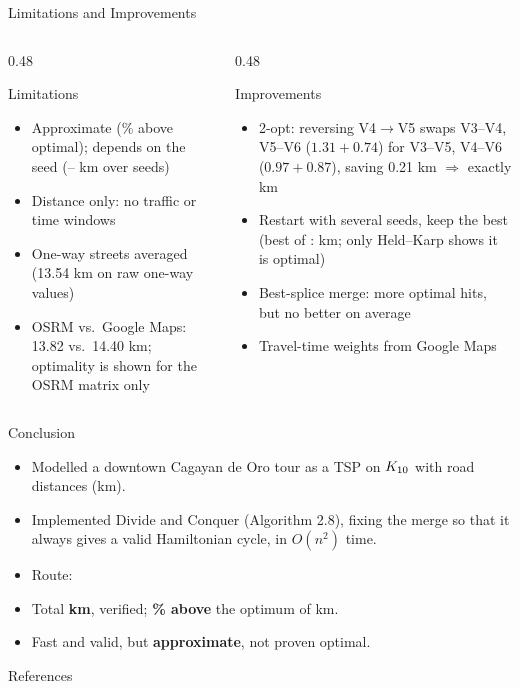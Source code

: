 \begin{frame}{Limitations and Improvements}
  \begin{columns}[T]
    \begin{column}{0.48\textwidth}
      \begin{block}{Limitations}
        \small
        \begin{itemize}
          \item Approximate (\DCGap\% above optimal); depends on the seed (\BridgeBest{}--\BridgeWorst{} km
                over \RunCount{} seeds)
          \item Distance only: no traffic or time windows
          \item One-way streets averaged (13.54 km on raw one-way values)
          \item OSRM vs.\ Google Maps: 13.82 vs.\ 14.40 km; optimality is shown for the OSRM matrix only
        \end{itemize}
      \end{block}
    \end{column}
    \begin{column}{0.48\textwidth}
      \begin{block}{Improvements}
        \small
        \begin{itemize}
          \item 2-opt: reversing V4$\to$V5 swaps V3--V4, V5--V6 ($1.31+0.74$) for V3--V5, V4--V6
                ($0.97+0.87$), saving 0.21 km $\Rightarrow$ exactly \OptTotal{} km
          \item Restart with several seeds, keep the best (best of \RunCount{}: \BridgeBest{} km; only
                Held--Karp shows it is optimal)
          \item Best-splice merge: more optimal hits, but no better on average
          \item Travel-time weights from Google Maps
        \end{itemize}
      \end{block}
    \end{column}
  \end{columns}
\end{frame}

\begin{frame}{Conclusion}
  \begin{itemize}
    \item Modelled a downtown Cagayan de Oro tour as a TSP on $K_{10}$ with road distances (km).
    \item Implemented Divide and Conquer (Algorithm 2.8), fixing the merge so that it always gives a
          valid Hamiltonian cycle, in $O(n^2)$ time.
    \item Route: \DCRoute{}
    \item Total \textbf{\DCTotal{} km}, verified; \textbf{\DCGap\% above} the optimum of \OptTotal{} km.
    \item Fast and valid, but \textbf{approximate}, not proven optimal.
  \end{itemize}
\end{frame}

\begin{frame}[allowframebreaks]{References}
  \tiny
  \nocite{lunagarcia2024performance, karp1977probabilistic, codingdrills_dc_tsp, morenomaza_dc, osm, googlemaps, luxen2011osrm, hunter2007matplotlib, applegate2006tsp}
  
  
\end{frame}
